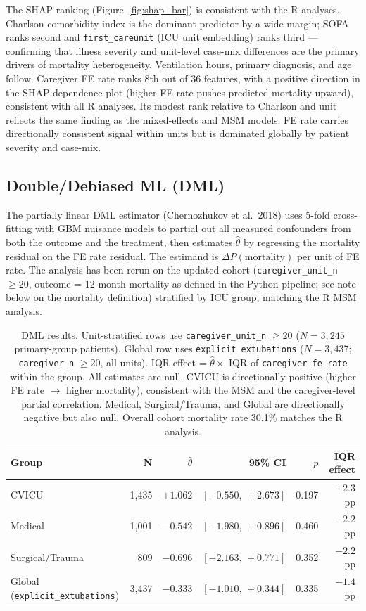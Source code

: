 \documentclass[11pt]{article}
\begin{document}
The SHAP ranking (Figure~\ref{fig:shap_bar}) is consistent with the R
analyses. Charlson comorbidity index is the dominant predictor by a wide
margin; SOFA ranks second and \texttt{first\_careunit} (ICU unit embedding)
ranks third --- confirming that illness severity and unit-level case-mix
differences are the primary drivers of mortality heterogeneity. Ventilation
hours, primary diagnosis, and age follow. Caregiver FE rate ranks 8th out of
36 features, with a positive direction in the SHAP dependence plot (higher FE
rate pushes predicted mortality upward), consistent with all R analyses. Its
modest rank relative to Charlson and unit reflects the same finding as the
mixed-effects and MSM models: FE rate carries directionally consistent signal
within units but is dominated globally by patient severity and case-mix.

\subsection{Double/Debiased ML (DML)}
\label{sec:dml}

The partially linear DML estimator (Chernozhukov et al.\ 2018) uses 5-fold
cross-fitting with GBM nuisance models to partial out all measured confounders
from both the outcome and the treatment, then estimates $\hat{\theta}$ by
regressing the mortality residual on the FE rate residual. The estimand is
$\Delta P(\text{mortality})$ per unit of FE rate. The analysis has been
rerun on the updated cohort (\texttt{caregiver\_unit\_n} $\geq 20$, outcome =
12-month mortality as defined in the Python pipeline; see note below on
the mortality definition) stratified by ICU group, matching the R MSM
analysis.

\begin{table}[h!]
\centering
\begin{tabular}{lrrrrr}
\toprule
Group & N & $\hat{\theta}$ & 95\% CI & $p$ & IQR effect \\
\midrule
CVICU           & 1,435 & $+1.062$ & $[-0.550,\,+2.673]$ & 0.197 & $+2.3$ pp \\
Medical         & 1,001 & $-0.542$ & $[-1.980,\,+0.896]$ & 0.460 & $-2.2$ pp \\
Surgical/Trauma &   809 & $-0.696$ & $[-2.163,\,+0.771]$ & 0.352 & $-2.2$ pp \\
\midrule
Global (\texttt{explicit\_extubations}) & 3,437 & $-0.333$ & $[-1.010,\,+0.344]$ & 0.335 & $-1.4$ pp \\
\bottomrule
\end{tabular}
\caption{DML results. Unit-stratified rows use \texttt{caregiver\_unit\_n} $\geq 20$
($N = 3{,}245$ primary-group patients). Global row uses \texttt{explicit\_extubations}
($N = 3{,}437$; \texttt{caregiver\_n} $\geq 20$, all units). IQR effect =
$\hat{\theta} \times$ IQR of \texttt{caregiver\_fe\_rate} within the group.
All estimates are null. CVICU is directionally positive (higher FE rate
$\to$ higher mortality), consistent with the MSM and the caregiver-level
partial correlation. Medical, Surgical/Trauma, and Global are
directionally negative but also null.
Overall cohort mortality rate 30.1\% matches the R analysis.}
\label{tab:dml}
\end{table}
\end{document}
